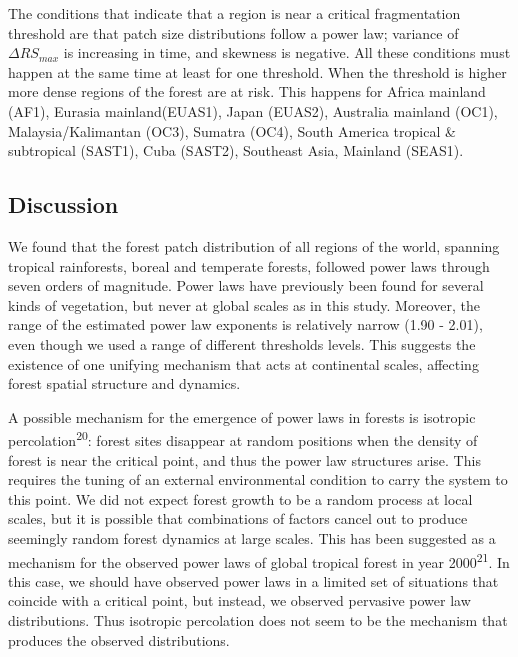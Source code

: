 \documentclass[]{article}
\begin{document}
The conditions that indicate that a region is near a critical
fragmentation threshold are that patch size distributions follow a power
law; variance of \(\Delta RS_{max}\) is increasing in time, and skewness
is negative. All these conditions must happen at the same time at least
for one threshold. When the threshold is higher more dense regions of
the forest are at risk. This happens for Africa mainland (AF1), Eurasia
mainland(EUAS1), Japan (EUAS2), Australia mainland (OC1),
Malaysia/Kalimantan (OC3), Sumatra (OC4), South America tropical \&
subtropical (SAST1), Cuba (SAST2), Southeast Asia, Mainland (SEAS1).

\subsection{Discussion}\label{discussion}

We found that the forest patch distribution of all regions of the world,
spanning tropical rainforests, boreal and temperate forests, followed
power laws through seven orders of magnitude. Power laws have previously
been found for several kinds of vegetation, but never at global scales
as in this study. Moreover, the range of the estimated power law
exponents is relatively narrow (1.90 - 2.01), even though we used a
range of different thresholds levels. This suggests the existence of one
unifying mechanism that acts at continental scales, affecting forest
spatial structure and dynamics.

A possible mechanism for the emergence of power laws in forests is
isotropic percolation\textsuperscript{20}: forest sites disappear at
random positions when the density of forest is near the critical point,
and thus the power law structures arise. This requires the tuning of an
external environmental condition to carry the system to this point. We
did not expect forest growth to be a random process at local scales, but
it is possible that combinations of factors cancel out to produce
seemingly random forest dynamics at large scales. This has been
suggested as a mechanism for the observed power laws of global tropical
forest in year 2000\textsuperscript{21}. In this case, we should have
observed power laws in a limited set of situations that coincide with a
critical point, but instead, we observed pervasive power law
distributions. Thus isotropic percolation does not seem to be the
mechanism that produces the observed distributions.
\end{document}
